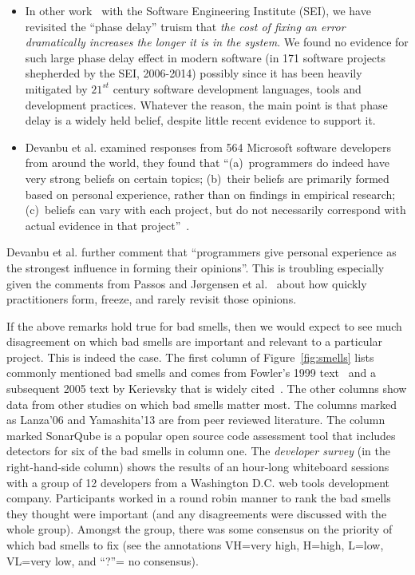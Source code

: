 \documentclass[twocolumn,5p]{elsarticle}
\newcommand{\bi}{\begin{itemize}[leftmargin=0.4cm]}
\newcommand{\ei}{\end{itemize}}
\newcommand{\fig}[1]{Figure~\ref{fig:#1}}
\theoremstyle{break}
\begin{document}
	\bi
	\item
	In other work~\cite{me16phase} with the Software Engineering Institute (SEI), we have revisited
	the ``phase delay'' truism that {\em the cost of fixing an error dramatically increases the longer it is in the system}. 
	We found no evidence for such large   phase delay effect in modern
	software (in 171 software projects shepherded
	by the SEI, 2006-2014) possibly since it has been  heavily mitigated by $21^{st}$ century software development languages, tools and development practices. 
	Whatever the reason, the main point  is that phase delay is a widely
	held belief, despite little recent evidence to support it.
	\item
	Devanbu et al. examined responses from 564 Microsoft software developers from around
	the world, they found that  ``(a)~programmers do indeed have very
	strong beliefs on certain topics; (b)~their beliefs are primarily formed
	based on personal experience, rather than on findings in empirical
	research; (c)~beliefs can vary with each project, but do not necessarily
	correspond with actual evidence in that project''~\cite{prem16}.
	\ei
	Devanbu et al. further  comment that ``programmers give personal experience
	as the strongest influence in forming their opinions''. This is troubling
	especially given the comments from Passos and J{\o}rgensen et al.~\cite{passos11,jorgensen09} about how quickly practitioners form, freeze, and rarely revisit those opinions.
	
	
	
	
	
	If the above remarks hold true for bad smells, then we would expect
	to see much disagreement on which bad smells are important and relevant
	to  a particular project. This is indeed the case.
	The first column of \fig{smells} 
	lists  commonly mentioned bad smells and comes from Fowler's 1999 text~\cite{fowler99} and a subsequent 2005 text by Kerievsky that is widely cited~\cite{Kerievsky2005}.
	The other
	columns show data from other studies on which bad smells matter most.
	The columns marked as Lanza'06 and Yamashita'13 are from peer reviewed literature. The column marked SonarQube is a popular open source
	code assessment tool that includes detectors for six of the bad smells
	in column one. 
	The {\em developer survey} (in the right-hand-side column) shows the results of an hour-long whiteboard sessions with a group of 12 developers from a Washington
	D.C. web tools development company. Participants
	worked in a round robin manner to rank the bad smells they thought were
	important (and any disagreements were discussed with the whole group).
	Amongst the group, there was  some
	consensus on  the priority of which bad smells to fix
	(see the annotations VH=very high,
	H=high, L=low, VL=very low, and ``?''= no consensus).  
	
\end{document}
